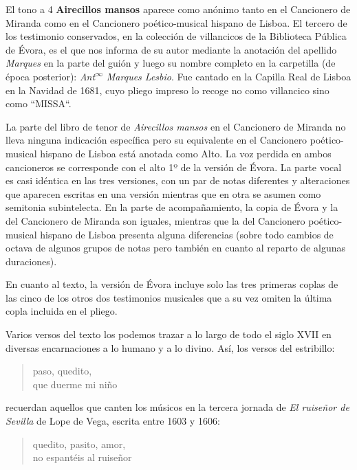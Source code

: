El tono a 4 \textbf{Airecillos mansos} aparece como anónimo tanto en el Cancionero de Miranda como en el Cancionero poético-musical hispano de Lisboa. El tercero de los testimonio conservados, en la colección de villancicos de la Biblioteca Pública de Évora, es el que nos informa de su autor mediante la anotación del apellido \textit{Marques} en la parte del guión y luego su nombre completo en la carpetilla (de época posterior): \textit{Ant\textsuperscript{$\infty$} Marques Lesbio}. Fue cantado en la Capilla Real de Lisboa en la Navidad de 1681, cuyo pliego impreso lo recoge no como villancico sino como ``MISSA``. 

La parte del libro de tenor de \textit{Airecillos mansos} en el Cancionero de Miranda no lleva ninguna indicación específica pero su equivalente en el Cancionero poético-musical hispano de Lisboa está anotada como Alto. La voz perdida en ambos cancioneros se corresponde con el alto 1º de la versión de Évora. La parte vocal es casi idéntica en las tres versiones, con un par de notas diferentes y alteraciones que aparecen escritas en una versión mientras que en otra se asumen como semitonia subintelecta. En la parte de acompañamiento, la copia de Évora y la del Cancionero de Miranda son iguales, mientras que la del Cancionero poético-musical hispano de Lisboa presenta alguna diferencias (sobre todo cambios de octava de algunos grupos de notas pero también en cuanto al reparto de algunas duraciones).

En cuanto al texto, la versión de Évora incluye solo las tres primeras coplas de las cinco de los otros dos testimonios musicales que a su vez omiten la última copla incluida en el pliego. 

Varios versos del texto los podemos trazar a lo largo de todo el siglo XVII en diversas encarnaciones a lo humano y a lo divino. Así, los versos del estribillo:

\begingroup
\centering
\itshape
\begin{verse}
paso, quedito,\\
que duerme mi niño\\
\end{verse}
\endgroup

recuerdan aquellos que canten los músicos en la tercera jornada de \textit{El ruiseñor de Sevilla} de Lope de Vega, escrita entre 1603 y 1606:

\begingroup
\centering
\itshape
\begin{verse}
quedito, pasito, amor,\\
no espantéis al ruiseñor\\
\end{verse}
\endgroup


